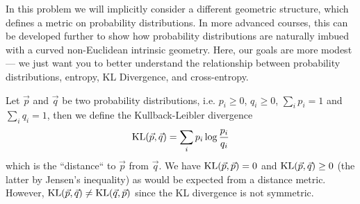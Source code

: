 \documentclass[preview]{standalone}
\begin{document}
In this problem we will implicitly consider a different geometric structure, which defines a
metric on probability distributions. In more advanced courses, this
can be developed further to show how probability distributions are
naturally imbued with a curved non-Euclidean intrinsic geometry. Here,
our goals are more modest --- we just want you to better understand the
relationship between probability distributions, entropy, KL
Divergence, and cross-entropy.

Let $\vec p$ and $\vec q$ be two probability
distributions, i.e. $p_i\geq 0$, $q_i\geq 0$, $\sum_i p_i = 1$ and $\sum_i q_i = 1$, then we define the Kullback-Leibler divergence
\begin{equation*}
\operatorname{KL}(\vec p, \vec q) = \sum_{i} p_i \log \frac{p_i}{q_i}
\end{equation*}
which is the ``distance`` to $\vec p$ from $\vec q$.
We have $\operatorname{KL}(\vec p, \vec p) = 0$ and $\operatorname{KL}(\vec p, \vec q) \geq 0$ (the latter by Jensen's inequality) as would be expected
from a distance metric. However, $\operatorname{KL}(\vec p, \vec q) \neq \operatorname{KL}(\vec q, \vec p)$ since the KL divergence is not symmetric.
\end{document}
